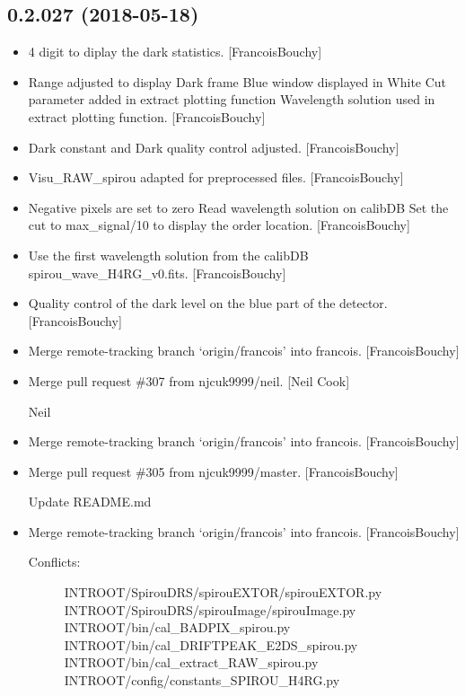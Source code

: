 \documentclass[a4paper,10pt,english]{report}
\begin{document}
\subsection{0.2.027 (2018-05-18)}
\label{\detokenize{misc/changelog:id433}}\begin{itemize}
\item {} 
4 digit to diplay the dark statistics. {[}FrancoisBouchy{]}

\item {} 
Range adjusted to display Dark frame Blue window displayed in White
Cut parameter added in extract plotting function Wavelength solution
used in extract plotting function. {[}FrancoisBouchy{]}

\item {} 
Dark constant and Dark quality control adjusted. {[}FrancoisBouchy{]}

\item {} 
Visu\_RAW\_spirou adapted for preprocessed files. {[}FrancoisBouchy{]}

\item {} 
Negative pixels are set to zero Read wavelength solution on calibDB
Set the cut to max\_signal/10 to display the order location.
{[}FrancoisBouchy{]}

\item {} 
Use the first wavelength solution from the calibDB
spirou\_wave\_H4RG\_v0.fits. {[}FrancoisBouchy{]}

\item {} 
Quality control of the dark level on the blue part of the detector.
{[}FrancoisBouchy{]}

\item {} 
Merge remote-tracking branch ‘origin/francois’ into francois.
{[}FrancoisBouchy{]}

\item {} 
Merge pull request \#307 from njcuk9999/neil. {[}Neil Cook{]}

Neil

\item {} 
Merge remote-tracking branch ‘origin/francois’ into francois.
{[}FrancoisBouchy{]}

\item {} 
Merge pull request \#305 from njcuk9999/master. {[}FrancoisBouchy{]}

Update README.md

\item {} 
Merge remote-tracking branch ‘origin/francois’ into francois.
{[}FrancoisBouchy{]}
\begin{description}
\item[{Conflicts:}] \leavevmode
INTROOT/SpirouDRS/spirouEXTOR/spirouEXTOR.py
INTROOT/SpirouDRS/spirouImage/spirouImage.py
INTROOT/bin/cal\_BADPIX\_spirou.py
INTROOT/bin/cal\_DRIFTPEAK\_E2DS\_spirou.py
INTROOT/bin/cal\_extract\_RAW\_spirou.py
INTROOT/config/constants\_SPIROU\_H4RG.py

\end{description}

\end{itemize}
\end{document}
